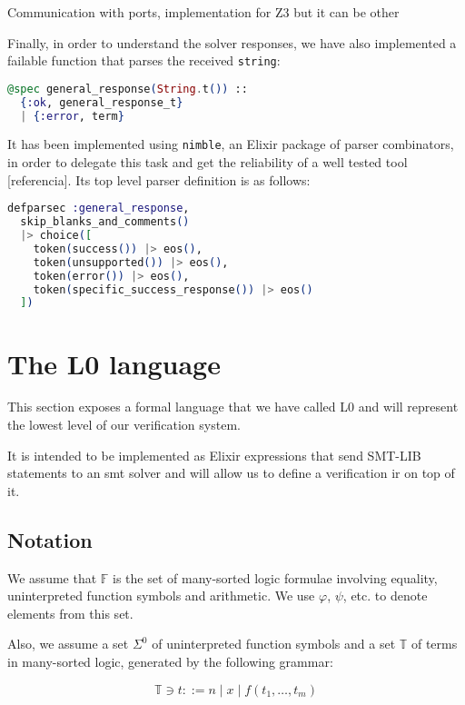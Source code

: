 Communication with ports, implementation for Z3 but it can be other

Finally, in order to understand the solver responses, we have also implemented
a failable function that parses the received \verb|string|:

\begin{lstlisting}[language=elixir,numbers=none,frame=none]
@spec general_response(String.t()) :: 
  {:ok, general_response_t} 
  | {:error, term}
\end{lstlisting}

It has been implemented using \verb|nimble|, an Elixir package of parser
combinators, in order to delegate this task and get the reliability of a well
tested tool [referencia]. Its top level parser definition is as follows:

\begin{lstlisting}[language=elixir,numbers=none,frame=none]
defparsec :general_response,
  skip_blanks_and_comments()
  |> choice([
    token(success()) |> eos(),
    token(unsupported()) |> eos(),
    token(error()) |> eos(),
    token(specific_success_response()) |> eos()
  ])
\end{lstlisting}

\section{The L0 language}

This section exposes a formal language that we have called L0 and will
represent the lowest level of our verification system.

It is intended to be implemented as Elixir expressions that send SMT-LIB 
statements to an \acrshort{smt} solver and will allow us to define a
verification \gls{ir} on top of it.

\subsection{Notation}

We assume that $\mathbb{F}$ is the set of many-sorted logic formulae involving
equality, uninterpreted function symbols and arithmetic. We use $\varphi$, 
$\psi$, etc. to denote elements from this set.

Also, we assume a set $\Sigma^{0}$ of uninterpreted function symbols and a set
$\mathbb{T}$ of terms in many-sorted logic, generated by the following grammar:

\[
\mathbb{T} \ni t ::= n \mid x \mid f(t_1, \ldots, t_m)
\]

